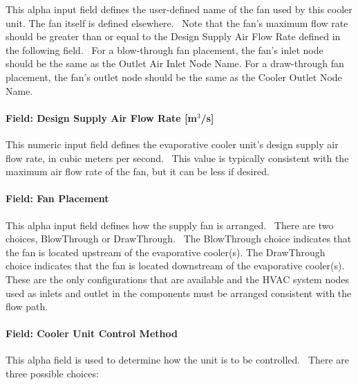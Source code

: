 This alpha input field defines the user-defined name of the fan used by this cooler unit. The fan itself is defined elsewhere.~ Note that the fan's maximum flow rate should be greater than or equal to the Design Supply Air Flow Rate defined in the following field.~ For a blow-through fan placement, the fan's inlet node should be the same as the Outlet Air Inlet Node Name. For a draw-through fan placement, the fan's outlet node should be the same as the Cooler Outlet Node Name.

\paragraph{Field: Design Supply Air Flow Rate {[}m\(^{3}\)/s{]}}\label{field-design-supply-air-flow-rate-m3s}

This numeric input field defines the evaporative cooler unit's design supply air flow rate, in cubic meters per second.~ This value is typically consistent with the maximum air flow rate of the fan, but it can be less if desired.

\paragraph{Field: Fan Placement}\label{field-fan-placement-001}

This alpha input field defines how the supply fan is arranged.~ There are two choices, BlowThrough or DrawThrough.~ The BlowThrough choice indicates that the fan is located upstream of the evaporative cooler(s). The DrawThrough choice indicates that the fan is located downstream of the evaporative cooler(s). These are the only configurations that are available and the HVAC system nodes used as inlets and outlet in the components must be arranged consistent with the flow path.

\paragraph{Field: Cooler Unit Control Method}\label{field-cooler-unit-control-method}

This alpha field is used to determine how the unit is to be controlled.~ There are three possible choices:

